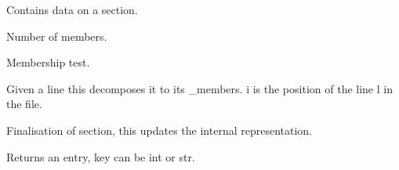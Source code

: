 \documentclass[letterpaper,10pt,english]{sphinxmanual}
\begin{document}
\begin{fulllineitems}
\label{\detokenize{ref/LAS/core/LASRead:TotalDepth.LAS.core.LASRead.LASSection}}
Contains data on a section.

\begin{fulllineitems}
\label{\detokenize{ref/LAS/core/LASRead:TotalDepth.LAS.core.LASRead.LASSection.__len__}}
Number of members.

\end{fulllineitems}


\begin{fulllineitems}
\label{\detokenize{ref/LAS/core/LASRead:TotalDepth.LAS.core.LASRead.LASSection.__contains__}}
Membership test.

\end{fulllineitems}


\begin{fulllineitems}
\label{\detokenize{ref/LAS/core/LASRead:TotalDepth.LAS.core.LASRead.LASSection.addMemberLine}}
Given a line this decomposes it to its \_members. i is the position
of the line l in the file.

\end{fulllineitems}


\begin{fulllineitems}
\label{\detokenize{ref/LAS/core/LASRead:TotalDepth.LAS.core.LASRead.LASSection.finalise}}
Finalisation of section, this updates the internal representation.

\end{fulllineitems}


\begin{fulllineitems}
\label{\detokenize{ref/LAS/core/LASRead:TotalDepth.LAS.core.LASRead.LASSection.__getitem__}}
Returns an entry, key can be int or str.


\end{fulllineitems}
\end{fulllineitems}
\end{document}
